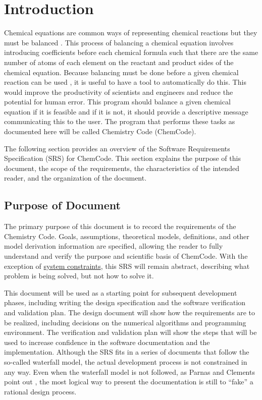 \documentclass[12pt]{article}
\begin{document}
\section{Introduction}
\label{Sec:Intro}
Chemical equations are common ways of representing chemical reactions but they must be balanced \cite{lund2023}. This process of balancing a chemical equation involves introducing coefficients before each chemical formula such that there are the same number of atoms of each element on the reactant and product sides of the chemical equation. Because balancing must be done before a given chemical reaction can be used \cite{lund2023}, it is useful to have a tool to automatically do this. This would improve the productivity of scientists and engineers and reduce the potential for human error. This program should balance a given chemical equation if it is feasible and if it is not, it should provide a descriptive message communicating this to the user. The program that performs these tasks as documented here will be called Chemistry Code (ChemCode).

The following section provides an overview of the Software Requirements Specification (SRS) for ChemCode. This section explains the purpose of this document, the scope of the requirements, the characteristics of the intended reader, and the organization of the document.

\subsection{Purpose of Document}
\label{Sec:DocPurpose}
The primary purpose of this document is to record the requirements of the Chemistry Code. Goals, assumptions, theoretical models, definitions, and other model derivation information are specified, allowing the reader to fully understand and verify the purpose and scientific basis of ChemCode. With the exception of \hyperref[Sec:SysConstraints]{system constraints}, this SRS will remain abstract, describing what problem is being solved, but not how to solve it.

This document will be used as a starting point for subsequent development phases, including writing the design specification and the software verification and validation plan. The design document will show how the requirements are to be realized, including decisions on the numerical algorithms and programming environment. The verification and validation plan will show the steps that will be used to increase confidence in the software documentation and the implementation. Although the SRS fits in a series of documents that follow the so-called waterfall model, the actual development process is not constrained in any way. Even when the waterfall model is not followed, as Parnas and Clements point out \cite{parnasClements1986}, the most logical way to present the documentation is still to ``fake'' a rational design process.
\end{document}
